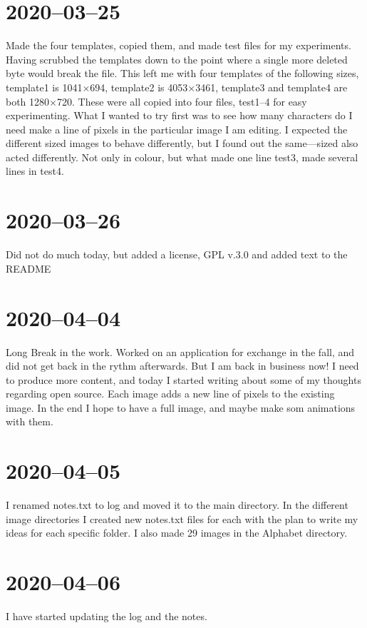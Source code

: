 \documentclass[12pt, letterpaper]{article}
\begin{document}
\section{2020--03--25}
Made the four templates, copied them, and made test files for my experiments.
Having scrubbed the templates down to the point where a single more deleted byte
would break the file. This left me with four templates of the following sizes,
template1 is 1041$\times$694, template2 is 4053$\times$3461, template3 and template4 are both
1280$\times$720. These were all copied into four files, test1--4 for easy experimenting.
What I wanted to try first was to see how many characters do I need
make a line of pixels in the particular image I am editing. I expected the
different sized images to behave differently, but I found out the same---sized
also acted differently. Not only in colour, but what made one line test3, made
several lines in test4.

\section{2020--03--26}
Did not do much today, but added a license, GPL v.3.0 and added text to the
README

\section{2020--04--04}
Long Break in the work. Worked on an application for exchange in the fall, and
did not get back in the rythm afterwards. But I am back in business now! I need
to produce more content, and today I started writing about some of my thoughts
regarding open source. Each image adds a new line of pixels to the existing
image. In the end I hope to have a full image, and maybe make som animations
with them.

\section{2020--04--05}
I renamed notes.txt to log and moved it to the main directory. In the different
image directories I created new notes.txt files for each with the plan to write
my ideas for each specific folder. I also made 29 images in the Alphabet
directory.

\section{2020--04--06}
I have started updating the log and the notes.
\end{document}

